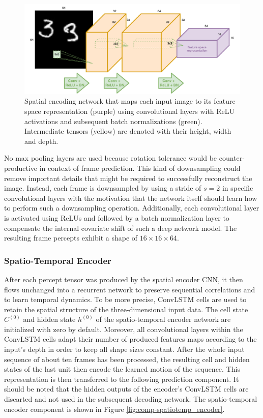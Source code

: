 \begin{figure}[htb]
	\centering
	\includegraphics[width=0.9\linewidth]{figures/comp_spatial_encoder.pdf} 
	\caption[Spatial Encoder Component]{Spatial encoding network that maps each input image to its feature space representation (purple) using convolutional layers with ReLU activations and subsequent batch normalizations (green). Intermediate tensors (yellow) are denoted with their height, width and depth.} \label{fig:comp-spatial_encoder}
\end{figure}

No max pooling layers are used because rotation tolerance would be counter-productive in context of frame prediction. This kind of downsampling could remove important details that might be required to successfully reconstruct the image. Instead, each frame is downsampled by using a stride of $ s=2 $ in specific convolutional layers with the motivation that the network itself should learn how to perform such a downsampling operation. Additionally, each convolutional layer is activated using ReLUs and followed by a batch normalization layer to compensate the internal covariate shift of such a deep network model. The resulting frame percepts exhibit a shape of $16\times16\times64$.

\subsubsection{Spatio-Temporal Encoder}



After each percept tensor was produced by the spatial encoder CNN, it then flows unchanged into a recurrent network to preserve sequential correlations and to learn temporal dynamics. To be more precise, ConvLSTM cells are used to retain the spatial structure of the three-dimensional input data. The cell state $C^{(0)}$ and hidden state $h^{(0)}$ of the spatio-temporal encoder network are initialized with zero by default. Moreover, all convolutional layers within the ConvLSTM cells adapt their number of produced features maps according to the input's depth in order to keep all shape sizes constant. After the whole input sequence of about ten frames has been processed, the resulting cell and hidden states of the last unit then encode the learned motion of the sequence. This representation is then transferred to the following prediction component. It should be noted that the hidden outputs of the encoder's ConvLSTM cells are discarted and not used in the subsequent decoding network. The spatio-temporal encoder component is shown in Figure \ref{fig:comp-spatiotemp_encoder}.


